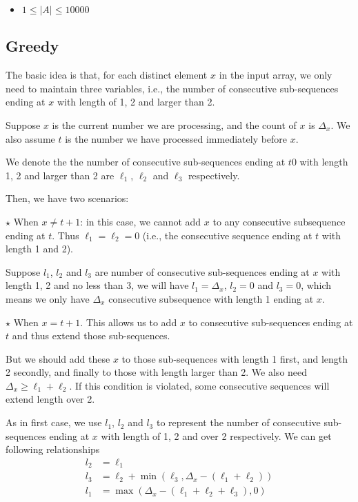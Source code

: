 \begin{itemize}
\item  $ 1 \leq \lvert A\rvert \leq 10000$
\end{itemize}

\subsection{Greedy}
The basic idea is that, for each distinct element $x$ in the input array, we only need to maintain three variables, i.e., the number of consecutive sub-sequences ending at $x$ with length of 1, 2 and larger than 2.

Suppose $x$ is the current number we are processing, and the count of $x$ is $\Delta_x$. We also assume $t$ is the number we have processed immediately before $x$.

We denote the the number of consecutive sub-sequences ending at $t0$ with length 1, 2 and larger than 2 are $\ell_1$, $\ell_2$ and $\ell_3$ respectively.

Then, we have two scenarios:

$\star$  When $x\neq t+1$: in this case, we cannot add $x$ to any consecutive subsequence ending at $t$. Thus $\ell_1=\ell_2=0$ (i.e., the consecutive sequence ending at $t$ with length 1 and 2).
 
Suppose $l_1$, $l_2$ and $l_3$ are number of consecutive sub-sequences ending at $x$ with length 1, 2 and no less than 3, we will have $l_1=\Delta_x$, $l_2=0$ and $l_3=0$, which means we only have $\Delta_x$ consecutive subsequence with length 1 ending at $x$.

$\star$ When $x=t+1$. This allows us to add $x$ to consecutive sub-sequences ending at $t$ and thus extend those sub-sequences.

But we should add these $x$ to those sub-sequences with length 1 first, and length 2 secondly, and finally to those with length larger than 2. We also need $\Delta_x\geq \ell_1+\ell_2$. If this condition is violated, some consecutive sequences will extend length over 2.

As in first case, we use $l_1$, $l_2$ and $l_3$ to represent the number of consecutive sub-sequences ending at $x$ with length of 1, 2 and over 2 respectively. We can get following relationships
\begin{align*}
    l_2 &= \ell_1 \\
    l_3 &= \ell_2 + \min(\ell_3, \Delta_x-(\ell_1+\ell_2)) \\
   l_1 &= \max(\Delta_x - (\ell_1+\ell_2+\ell_3), 0)
\end{align*}

